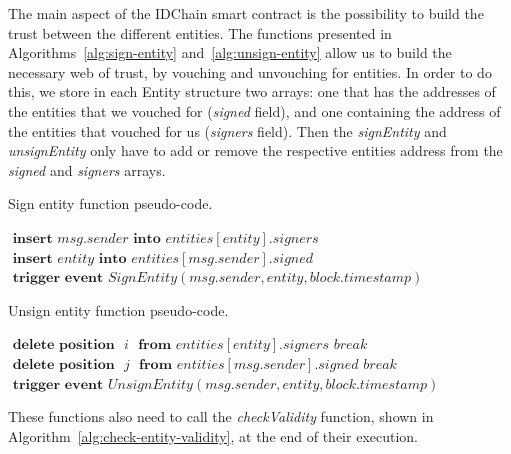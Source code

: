 The main aspect of the IDChain smart contract is the possibility to build the trust between the different entities.
The functions presented in Algorithms~\ref{alg:sign-entity} and~\ref{alg:unsign-entity} allow us to build the necessary web of trust, by vouching and unvouching for entities.
In order to do this, we store in each Entity structure two arrays: one that has the addresses of the entities that we vouched for (\textit{signed} field), and one containing the address of the entities that vouched for us (\textit{signers} field).
Then the \textit{signEntity} and \textit{unsignEntity} only have to add or remove the respective entities address from the \textit{signed} and \textit{signers} arrays.

\begin{algorithm}[h!]
  \caption{Sign entity function pseudo-code.}
  \label{alg:sign-entity}
  \begin{algorithmic}[1]
      \State $\textbf{ insert } msg.sender \textbf{ into } entities[entity].signers$
      \State $\textbf{ insert } entity \textbf{ into } entities[msg.sender].signed$
      \State $\textbf{ trigger event } SignEntity(msg.sender, entity, block.timestamp)$
      \State {}
    \EndFunction
  \end{algorithmic}
\end{algorithm}

\begin{algorithm}[h!]
  \caption{Unsign entity function pseudo-code.}
  \label{alg:unsign-entity}
  \begin{algorithmic}[1]
          \State $\textbf{ delete position } \textit{ i } \textbf{ from } entities[entity].signers$
          \State $break$
        \EndIf
      \EndFor
      \State
          \State $\textbf{ delete position } \textit{ j }\textbf{ from } entities[msg.sender].signed$
          \State $break$
        \EndIf
      \EndFor
      \State
      \State $\textbf{ trigger event } UnsignEntity(msg.sender, entity, block.timestamp)$
      \State
      \State {}
    \EndFunction
  \end{algorithmic}
\end{algorithm}

These functions also need to call the \textit{checkValidity} function, shown in Algorithm~\ref{alg:check-entity-validity}, at the end of their execution.


